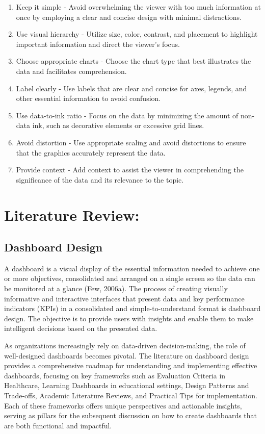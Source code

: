 \documentclass[print]{nuthesis}
\begin{document}
\begin{enumerate}
\def\labelenumi{\arabic{enumi}.}
\item
  Keep it simple - Avoid overwhelming the viewer with too much information at once by employing a clear and concise design with minimal distractions.
\item
  Use visual hierarchy - Utilize size, color, contrast, and placement to highlight important information and direct the viewer's focus.
\item
  Choose appropriate charts - Choose the chart type that best illustrates the data and facilitates comprehension.
\item
  Label clearly - Use labels that are clear and concise for axes, legends, and other essential information to avoid confusion.
\item
  Use data-to-ink ratio - Focus on the data by minimizing the amount of non-data ink, such as decorative elements or excessive grid lines.
\item
  Avoid distortion - Use appropriate scaling and avoid distortions to ensure that the graphics accurately represent the data.
\item
  Provide context - Add context to assist the viewer in comprehending the significance of the data and its relevance to the topic.
\end{enumerate}

\hypertarget{literature-review}{%
\section{Literature Review:}\label{literature-review}}

\hypertarget{dashboard-design-1}{%
\subsection{Dashboard Design}\label{dashboard-design-1}}

A dashboard is a visual display of the essential information needed to achieve one or more objectives, consolidated and arranged on a single screen so the data can be monitored at a glance (Few, 2006a).
The process of creating visually informative and interactive interfaces that present data and key performance indicators (KPIs) in a consolidated and simple-to-understand format is dashboard design.
The objective is to provide users with insights and enable them to make intelligent decisions based on the presented data.

As organizations increasingly rely on data-driven decision-making, the role of well-designed dashboards becomes pivotal.
The literature on dashboard design provides a comprehensive roadmap for understanding and implementing effective dashboards, focusing on key frameworks such as Evaluation Criteria in Healthcare, Learning Dashboards in educational settings, Design Patterns and Trade-offs, Academic Literature Reviews, and Practical Tips for implementation.
Each of these frameworks offers unique perspectives and actionable insights, serving as pillars for the subsequent discussion on how to create dashboards that are both functional and impactful.
\end{document}
